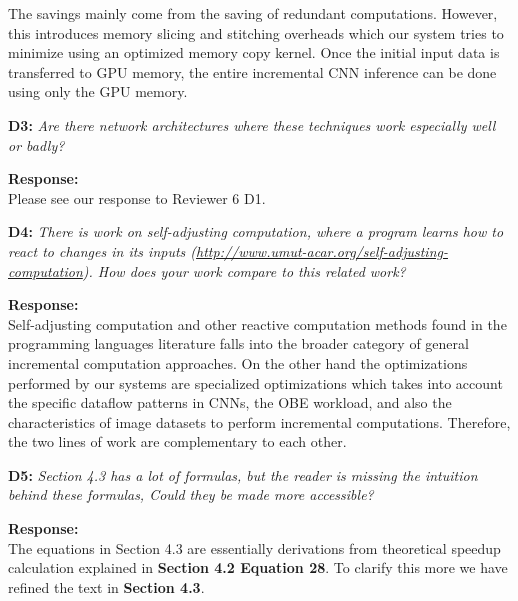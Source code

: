 \documentclass[preprint]{vldb}
\begin{document}
The savings mainly come from the saving of redundant computations. However, this introduces memory slicing and stitching overheads which our system tries to minimize using an optimized memory copy kernel. Once the initial input data is transferred to GPU memory, the entire incremental CNN inference can be done using only the GPU memory.

\vspace{2mm}
\noindent \textbf{D3:} \textit{Are there network architectures where these techniques work especially well or badly?}

\vspace{2mm}
\noindent \textbf{Response:}\\
Please see our response to Reviewer 6 D1.

\vspace{2mm}
\begin{sloppypar}
\noindent \textbf{D4:} \textit{There is work on self-adjusting computation, where a program learns how to react to changes in its inputs (\url{http://www.umut-acar.org/self-adjusting-computation}).
How does your work compare to this related work?}
\end{sloppypar}

\vspace{2mm}
\noindent \textbf{Response:}\\
Self-adjusting computation and other reactive computation methods found in the programming languages literature falls into the broader category of general incremental computation approaches. On the other hand the optimizations performed by our systems are specialized optimizations which takes into account the specific dataflow patterns in CNNs, the OBE workload, and also the characteristics of image datasets to perform incremental computations.
Therefore, the two lines of work are complementary to each other.

\vspace{2mm}
\noindent \textbf{D5:} \textit{Section 4.3 has a lot of formulas, but the reader is missing the intuition behind these formulas, Could they be made more accessible?}

\vspace{2mm}
\noindent \textbf{Response:}\\
The equations in Section 4.3 are essentially derivations from theoretical speedup calculation explained in \textbf{Section 4.2 Equation 28}.
To clarify this more we have refined the text in \textbf{Section 4.3}.
\end{document}
